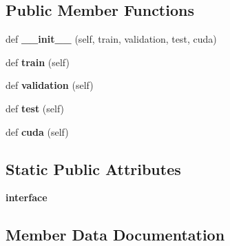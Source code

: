 \subsection*{Public Member Functions}
\begin{DoxyCompactItemize}
\item 
def {\bfseries \+\_\+\+\_\+init\+\_\+\+\_\+} (self, train, validation, test, cuda)\hypertarget{classutils_1_1Policy_a9e1695e6a06cd796e9f346065143a5d4}{}\label{classutils_1_1Policy_a9e1695e6a06cd796e9f346065143a5d4}

\item 
def {\bfseries train} (self)\hypertarget{classutils_1_1Policy_a765c68701a05f5073711bb41f34d2c00}{}\label{classutils_1_1Policy_a765c68701a05f5073711bb41f34d2c00}

\item 
def {\bfseries validation} (self)\hypertarget{classutils_1_1Policy_abe16bdb018b04f913d3ba4cc561adb5f}{}\label{classutils_1_1Policy_abe16bdb018b04f913d3ba4cc561adb5f}

\item 
def {\bfseries test} (self)\hypertarget{classutils_1_1Policy_a283e507c2e5ff4d90e0d99cbba963cfb}{}\label{classutils_1_1Policy_a283e507c2e5ff4d90e0d99cbba963cfb}

\item 
def {\bfseries cuda} (self)\hypertarget{classutils_1_1Policy_a3b4261468bc3786baba070c2389ecda2}{}\label{classutils_1_1Policy_a3b4261468bc3786baba070c2389ecda2}

\end{DoxyCompactItemize}
\subsection*{Static Public Attributes}
\begin{DoxyCompactItemize}
\item 
{\bfseries interface}
\end{DoxyCompactItemize}


\subsection{Member Data Documentation}
